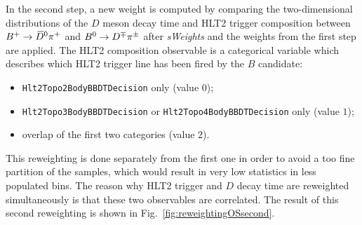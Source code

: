 In the second step, a new weight is computed by comparing the two-dimensional distributions of the $D$ meson decay time and HLT2 trigger composition between $B^+\rightarrow\kern 0.2em\overline{\kern -0.2em D}{}^0\pi^+$ and $B^0\rightarrow D^\mp\pi^\pm$ after \emph{sWeights} and the weights from the first step are applied. The HLT2 composition observable is a categorical variable which describes which HLT2 trigger line has been fired by the $B$ candidate:
\begin{itemize}[noitemsep,topsep=0pt]
  \item \verb!Hlt2Topo2BodyBBDTDecision! only (value $0$);
  \item \verb!Hlt2Topo3BodyBBDTDecision! or \verb!Hlt2Topo4BodyBBDTDecision! only (value $1$);
  \item overlap of the first two categories (value $2$). 
\end{itemize} 
This reweighting is done separately from the first one in order to avoid a too fine partition of the samples, which would result in very low statistics in less populated bins. The reason why HLT2 trigger and $D$ decay time are reweighted simultaneously is that these two observables are correlated.
The result of this second reweighting is shown in Fig.~\ref{fig:reweightingOSsecond}.


